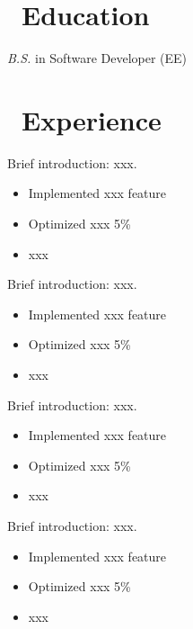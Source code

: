 \documentclass{resume}
\begin{document}



\section{\faGraduationCap\ Education}
\textit{B.S.} in Software Developer (EE)

\section{\faUsers\ Experience}
Brief introduction: xxx.
\begin{itemize}
  \item Implemented xxx feature
  \item Optimized xxx 5\%
  \item xxx
\end{itemize}

Brief introduction: xxx.
\begin{itemize}
  \item Implemented xxx feature
  \item Optimized xxx 5\%
  \item xxx
\end{itemize}

Brief introduction: xxx.
\begin{itemize}
  \item Implemented xxx feature
  \item Optimized xxx 5\%
  \item xxx
\end{itemize}

Brief introduction: xxx.
\begin{itemize}
  \item Implemented xxx feature
  \item Optimized xxx 5\%
  \item xxx
\end{itemize}
\end{document}
